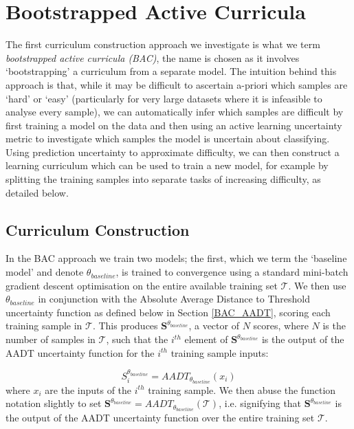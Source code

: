 \chapter{Bootstrapped Active Curricula}\label{ch:BootstrappedActiveCurricula}
The first curriculum construction approach we investigate is what we term \textit{bootstrapped active curricula (BAC)}, the name is chosen as it involves `bootstrapping' a curriculum from a separate model. The intuition behind this approach is that, while it may be difficult to ascertain a-priori which samples are `hard' or `easy' (particularly for very large datasets where it is infeasible to analyse every sample), we can automatically infer which samples are difficult by first training a model on the data and then using an active learning uncertainty metric to investigate which samples the model is uncertain about classifying. Using prediction uncertainty to approximate difficulty, we can then construct a learning curriculum which can be used to train a new model, for example by splitting the training samples into separate tasks of increasing difficulty, as detailed below.
\section{Curriculum Construction}
In the BAC approach we train two models; the first, which we term the `baseline model' and denote  $\theta_{baseline}$, is trained to convergence using a standard mini-batch gradient descent optimisation on the entire available training set $\mathcal{T}$. We then use $\theta_{baseline}$ in conjunction with the Absolute Average Distance to Threshold uncertainty function as defined below in Section \ref{BAC_AADT}, scoring each training sample in $\mathcal{T}$. This produces $\mathbf{S}^{\theta_{baseline}}$, a vector of $N$ scores, where $N$ is the number of samples in $\mathcal{T}$, such that the $i^{th}$ element of $\mathbf{S}^{\theta_{baseline}}$ is the output of the AADT uncertainty function for the $i^{th}$ training sample inputs:

\begin{equation}\label{eq:BAC_S}
S^{\theta_{baseline}}_i = AADT_{\theta_{baseline}}(x_i) 
\end{equation}
where $x_i$ are the inputs of the $i^{th}$ training sample. We then abuse the function notation slightly to set $\mathbf{S}^{\theta_{baseline}} = AADT_{\theta_{baseline}}(\mathcal{T}) $, i.e. signifying that $\mathbf{S}^{\theta_{baseline}} $ is the output of the AADT uncertainty function over the entire training set $\mathcal{T}$.

